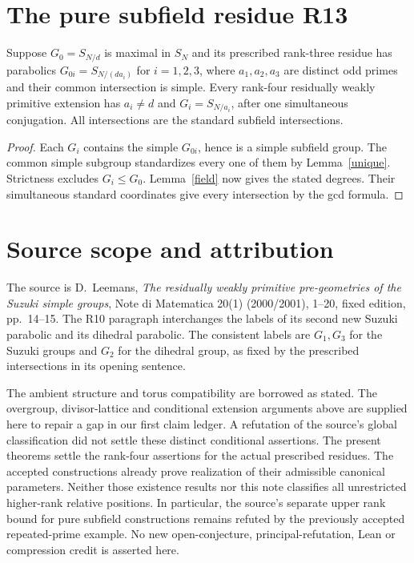 \documentclass[11pt,a4paper]{article}
\begin{document}
\section{The pure subfield residue R13}
\begin{theorem}
Suppose $G_0=S_{N/d}$ is maximal in $S_N$ and its prescribed rank-three
residue has parabolics $G_{0i}=S_{N/(da_i)}$ for $i=1,2,3$,
where $a_1,a_2,a_3$ are distinct odd primes and their common
intersection is simple. Every rank-four residually weakly primitive
extension has $a_i\ne d$ and $G_i=S_{N/a_i}$, after one simultaneous
conjugation. All intersections are the standard subfield intersections.
\end{theorem}
\begin{proof}
Each $G_i$ contains the simple $G_{0i}$, hence is a simple subfield
group. The common simple subgroup standardizes every one of them
by Lemma~\ref{unique}. Strictness excludes $G_i\le G_0$.
Lemma~\ref{field} now gives the stated degrees. Their simultaneous
standard coordinates give every intersection by the gcd formula.
\end{proof}

\section{Source scope and attribution}
The source is D.~Leemans, \emph{The residually weakly primitive
pre-geometries of the Suzuki simple groups}, Note di Matematica
20(1) (2000/2001), 1--20, fixed edition, pp.~14--15.
The R10 paragraph interchanges the labels of its second new Suzuki
parabolic and its dihedral parabolic. The consistent labels are
$G_1,G_3$ for the Suzuki groups and $G_2$ for the dihedral group,
as fixed by the prescribed intersections in its opening sentence.

The ambient structure and torus compatibility are borrowed as stated.
The overgroup, divisor-lattice and conditional extension arguments
above are supplied here to repair a gap in our first claim ledger.
A refutation of the source's global classification did not settle
these distinct conditional assertions. The present theorems settle
the rank-four assertions for the actual prescribed residues. The
accepted constructions already prove realization of their admissible
canonical parameters. Neither those existence results nor this note
classifies all unrestricted higher-rank relative positions. In
particular, the source's separate upper rank bound for pure subfield
constructions remains refuted by the previously accepted repeated-prime
example. No new open-conjecture, principal-refutation, Lean or
compression credit is asserted here.
\end{document}

